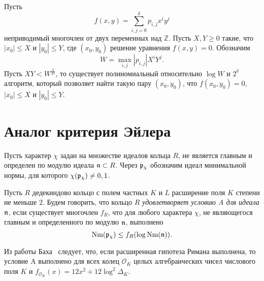 \documentclass[_00_dissertation.tex]{subfiles}
\begin{document}
\begin{statement}\label{statement:coppersmith}
    Пусть
    \begin{equation*}
        f(x, y) = \sum\limits_{i, j = 0}^{\delta} p_{i, j} x^i y^j
    \end{equation*}
    неприводимый многочлен от двух переменных над $\mathbb{Z}$.
    Пусть $X, Y \ge 0$ такие, что $|x_0| \le X$ и $|y_0| \le Y$, где $(x_0, y_0)$ решение уравнения $f(x, y) = 0$.
    Обозначим
    \begin{equation*}
        W = \max_{i, j} |p_{i, j}| X^i Y^j.
    \end{equation*}
    Пусть $XY < W^{\frac{3}{2\delta}}$, то существует полиномиальный относительно $\log W$ и $2^\delta$ алгоритм, который позволяет найти такую пару $(x_0, y_0)$, что $f(x_0, y_0) = 0$, $|x_0| \le X$ и $|y_0| \le Y$.
\end{statement}

\section{Аналог критерия Эйлера}

\begin{definition}
    Пусть характер $\chi$ задан на множестве идеалов кольца $R$, не является главным и определен по модулю идеала $\mathfrak{n} \subset R$.
    Через $\mathfrak{p}_{\chi}$ обозначим идеал минимальной нормы, для которого $\chi(\mathfrak{p}_{\chi}) \neq 0, 1$.
\end{definition}

\begin{definition}
    Пусть $R$ дедекиндово кольцо с полем частных $K$ и $L$ расширение поля $K$ степени не меньше $2$.
    Будем говорить, что кольцо $R$ \emph{удовлетворяет условию A для идеала $\mathfrak{n}$}, если существует многочлен $f_R$, что для любого характера $\chi$, не являющегося главным и определенного по модулю $\mathfrak{n}$, выполнено
    \begin{equation*}
        \textrm{Nm}(\mathfrak{p}_{\chi}) \le f_R(\log{\textrm{Nm}(\mathfrak{n})}).
    \end{equation*}
\end{definition}

\begin{remark}
    Из работы Баха~\cite{source:Bach} следует, что, если расширенная гипотеза Римана выполнена, то условие A выполнено для всех колец $\mathcal{O}_K$ целых алгебраических чисел числового поля $K$ и $f_{\mathcal{O}_K}(x) = 12x^2 + 12\log^2 \Delta_{K}$.
\end{remark}
\end{document}
